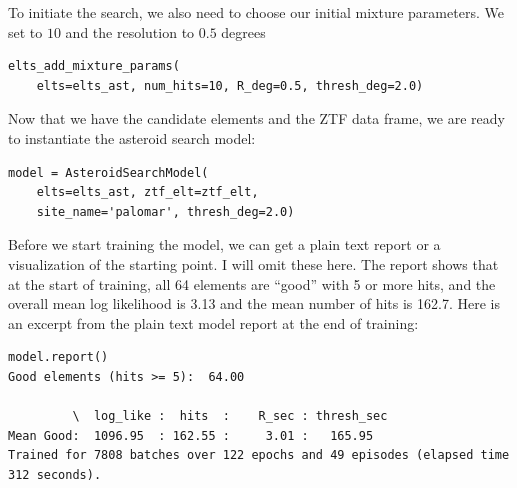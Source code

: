 To initiate the search, we also need to choose our initial mixture parameters.
We set  to $10$ and the resolution to $0.5$ degrees
\begin{lstlisting}[style=CodeSnippet]
elts_add_mixture_params(
	elts=elts_ast, num_hits=10, R_deg=0.5, thresh_deg=2.0)
\end{lstlisting}
Now that we have the candidate elements and the ZTF data frame, we are ready to instantiate the asteroid search model:
\begin{lstlisting}[style=CodeSnippet]
model = AsteroidSearchModel(
	elts=elts_ast, ztf_elt=ztf_elt, 
	site_name='palomar', thresh_deg=2.0)
\end{lstlisting}
Before we start training the model, we can get a plain text report or a visualization of the starting point.
I will omit these here. 
The report shows that at the start of training, all 64 elements are ``good'' with 5 or more hits,
and the overall mean log likelihood is 3.13 and the mean number of hits is 162.7.
Here is an excerpt from the plain text model report at the end of training:\\
\begin{minipage}{\linewidth}
\begin{lstlisting}[style=CodeSnippet]
model.report()
Good elements (hits >= 5):  64.00

         \  log_like :  hits  :    R_sec : thresh_sec
Mean Good:  1096.95  : 162.55 :     3.01 :   165.95
Trained for 7808 batches over 122 epochs and 49 episodes (elapsed time 312 seconds).
\end{lstlisting}
\end{minipage}

